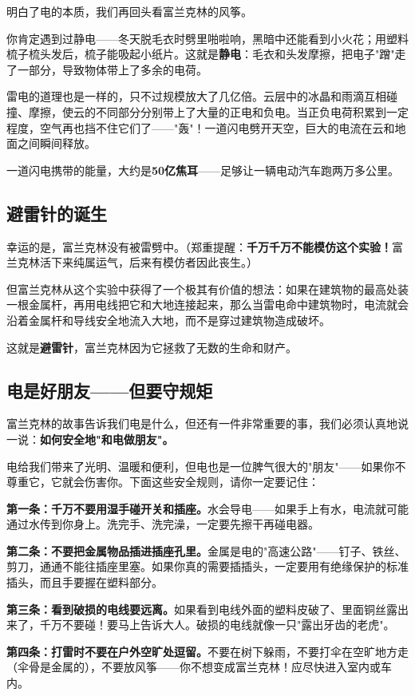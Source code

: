 \documentclass[a4paper,12pt]{ctexart}
\begin{document}
明白了电的本质，我们再回头看富兰克林的风筝。

你肯定遇到过静电——冬天脱毛衣时劈里啪啦响，黑暗中还能看到小火花；用塑料梳子梳头发后，梳子能吸起小纸片。这就是\textbf{静电}：毛衣和头发摩擦，把电子"蹭"走了一部分，导致物体带上了多余的电荷。

雷电的道理也是一样的，只不过规模放大了几亿倍。云层中的冰晶和雨滴互相碰撞、摩擦，使云的不同部分分别带上了大量的正电和负电。当正负电荷积累到一定程度，空气再也挡不住它们了——"轰"！一道闪电劈开天空，巨大的电流在云和地面之间瞬间释放。

一道闪电携带的能量，大约是\textbf{50亿焦耳}——足够让一辆电动汽车跑两万多公里。

\subsection*{避雷针的诞生}

幸运的是，富兰克林没有被雷劈中。（郑重提醒：\textbf{千万千万不能模仿这个实验！}富兰克林活下来纯属运气，后来有模仿者因此丧生。）

但富兰克林从这个实验中获得了一个极其有价值的想法：如果在建筑物的最高处装一根金属杆，再用电线把它和大地连接起来，那么当雷电命中建筑物时，电流就会沿着金属杆和导线安全地流入大地，而不是穿过建筑物造成破坏。

这就是\textbf{避雷针}，富兰克林因为它拯救了无数的生命和财产。

\subsection*{电是好朋友——但要守规矩}

富兰克林的故事告诉我们电是什么，但还有一件非常重要的事，我们必须认真地说一说：\textbf{如何安全地"和电做朋友"。}

电给我们带来了光明、温暖和便利，但电也是一位脾气很大的"朋友"——如果你不尊重它，它就会伤害你。下面这些安全规则，请你一定要记住：

\textbf{第一条：千万不要用湿手碰开关和插座。}水会导电——如果手上有水，电流就可能通过水传到你身上。洗完手、洗完澡，一定要先擦干再碰电器。

\textbf{第二条：不要把金属物品插进插座孔里。}金属是电的"高速公路"——钉子、铁丝、剪刀，通通不能往插座里塞。如果你真的需要插插头，一定要用有绝缘保护的标准插头，而且手要握在塑料部分。

\textbf{第三条：看到破损的电线要远离。}如果看到电线外面的塑料皮破了、里面铜丝露出来了，千万不要碰！要马上告诉大人。破损的电线就像一只"露出牙齿的老虎"。

\textbf{第四条：打雷时不要在户外空旷处逗留。}不要在树下躲雨，不要打伞在空旷地方走（伞骨是金属的），不要放风筝——你不想变成富兰克林！应尽快进入室内或车内。
\end{document}
